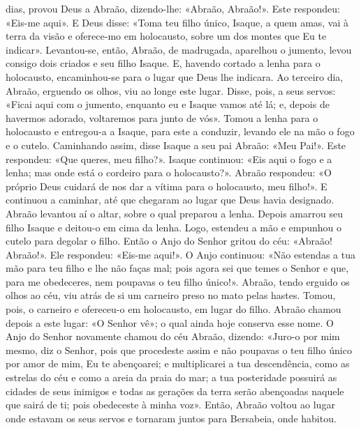 \begin{paracol}{2}
{ dias, provou Deus a Abraão, dizendo-lhe: «Abraão, Abraão!». Este respondeu: «Eis-me aqui». E Deus disse: «Toma teu filho único, Isaque, a quem amas, vai à terra da visão e oferece-mo em holocausto, sobre um dos montes que Eu te indicar». Levantou-se, então, Abraão, de madrugada, aparelhou o jumento, levou consigo dois criados e seu filho Isaque. E, havendo cortado a lenha para o holocausto, encaminhou-se para o lugar que Deus lhe indicara. Ao terceiro dia, Abraão, erguendo os olhos, viu ao longe este lugar. Disse, pois, a seus servos: «Ficai aqui com o jumento, enquanto eu e Isaque vamos até lá; e, depois de havermos adorado, voltaremos para junto de vós». Tomou a lenha para o holocausto e entregou-a a Isaque, para este a conduzir, levando ele na mão o fogo e o cutelo. Caminhando assim, disse Isaque a seu pai Abraão: «Meu Pai!». Este respondeu: «Que queres, meu filho?». Isaque continuou: «Eis aqui o fogo e a lenha; mas onde está o cordeiro para o holocausto?». Abraão respondeu: «O próprio Deus cuidará de nos dar a vítima para o holocausto, meu filho!». E continuou a caminhar, até que chegaram ao lugar que Deus havia designado. Abraão levantou aí o altar, sobre o qual preparou a lenha. Depois amarrou seu filho Isaque e deitou-o em cima da lenha. Logo, estendeu a mão e empunhou o cutelo para degolar o filho. Então o Anjo do Senhor gritou do céu: «Abraão! Abraão!». Ele respondeu: «Eis-me aqui!». O Anjo continuou: «Não estendas a tua mão para teu filho e lhe não faças mal; pois agora sei que temes o Senhor e que, para me obedeceres, nem poupavas o teu filho único!». Abraão, tendo erguido os olhos ao céu, viu atrás de si um carneiro preso no mato pelas hastes. Tomou, pois, o carneiro e ofereceu-o em holocausto, em lugar do filho. Abraão chamou depois a este lugar: «O Senhor vê»; o qual ainda hoje conserva esse nome. O Anjo do Senhor novamente chamou do céu Abraão, dizendo: «Juro-o por mim mesmo, diz o Senhor, pois que procedeste assim e não poupavas o teu filho único por amor de mim, Eu te abençoarei; e multiplicarei a tua descendência, como as estrelas do céu e como a areia da praia do mar; a tua posteridade possuirá as cidades de seus inimigos e todas as gerações da terra serão abençoadas naquele que sairá de ti; pois obedeceste à minha voz». Então, Abraão voltou ao lugar onde estavam os seus servos e tornaram juntos para Bersabeia, onde habitou.
}\switchcolumn*{}\switchcolumn{}
\end{paracol}
